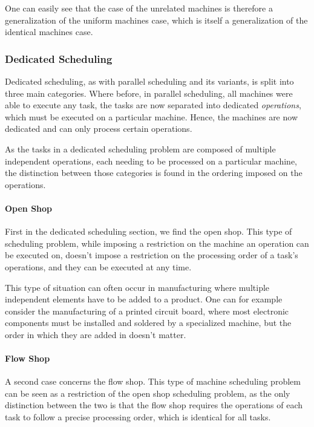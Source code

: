\documentclass{mimosis}
\begin{document}
One can easily see that the case of the unrelated machines is therefore a generalization of the uniform machines case, which is itself a generalization of the identical machines case.

\subsubsection{Dedicated Scheduling}

Dedicated scheduling, as with parallel scheduling and its variants, is split into three main categories. Where before, in parallel scheduling, all machines were able to execute any task, the tasks are now separated into dedicated \emph{operations}, which must be executed on a particular machine. Hence, the machines are now dedicated and can only process certain operations. 

As the tasks in a dedicated scheduling problem are composed of multiple independent operations, each needing to be processed on a particular machine, the distinction between those categories is found in the ordering imposed on the operations.

\paragraph{Open Shop}

First in the dedicated scheduling section, we find the open shop. This type of scheduling problem, while imposing a restriction on the machine an operation can be executed on, doesn't impose a restriction on the processing order of a task's operations, and they can be executed at any time.

This type of situation can often occur in manufacturing where multiple independent elements have to be added to a product. One can for example consider the manufacturing of a printed circuit board, where most electronic components must be installed and soldered by a specialized machine, but the order in which they are added in doesn't matter.

\paragraph{Flow Shop}

A second case concerns the flow shop. This type of machine scheduling problem can be seen as a restriction of the open shop scheduling problem, as the only distinction between the two is that the flow shop requires the operations of each task to follow a precise processing order, which is identical for all tasks.
\end{document}
